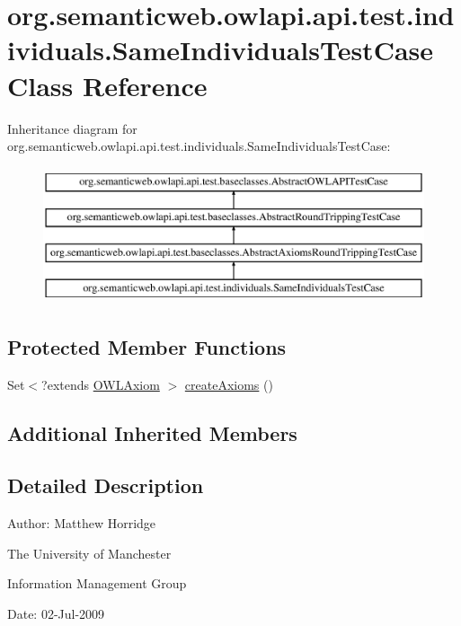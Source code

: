 \hypertarget{classorg_1_1semanticweb_1_1owlapi_1_1api_1_1test_1_1individuals_1_1_same_individuals_test_case}{\section{org.\-semanticweb.\-owlapi.\-api.\-test.\-individuals.\-Same\-Individuals\-Test\-Case Class Reference}
\label{classorg_1_1semanticweb_1_1owlapi_1_1api_1_1test_1_1individuals_1_1_same_individuals_test_case}
}
Inheritance diagram for org.\-semanticweb.\-owlapi.\-api.\-test.\-individuals.\-Same\-Individuals\-Test\-Case\-:\begin{figure}[H]
\begin{center}
\leavevmode
\includegraphics[height=4.000000cm]{classorg_1_1semanticweb_1_1owlapi_1_1api_1_1test_1_1individuals_1_1_same_individuals_test_case}
\end{center}
\end{figure}
\subsection*{Protected Member Functions}
\begin{DoxyCompactItemize}
\item 
Set$<$?extends \hyperlink{interfaceorg_1_1semanticweb_1_1owlapi_1_1model_1_1_o_w_l_axiom}{O\-W\-L\-Axiom} $>$ \hyperlink{classorg_1_1semanticweb_1_1owlapi_1_1api_1_1test_1_1individuals_1_1_same_individuals_test_case_aa042386a08321465610183fafaffd2d0}{create\-Axioms} ()
\end{DoxyCompactItemize}
\subsection*{Additional Inherited Members}


\subsection{Detailed Description}
Author\-: Matthew Horridge\par
 The University of Manchester\par
 Information Management Group\par
 Date\-: 02-\/\-Jul-\/2009 


